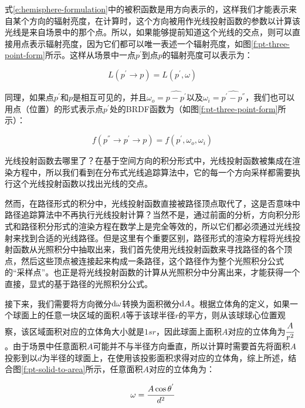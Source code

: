 式\ref{e:hemisphere-formulation}中的被积函数是用方向表示的，这样我们才能表示来自某个方向的辐射亮度，在计算时，这个方向被用作光线投射函数的参数以计算该光线是来自场景中的那个点。所以，如果能够提前知道这个光线的交点，则可以直接用点表示辐射亮度，因为它们都可以唯一表述一个辐射亮度，如图\ref{f:pt-three-point-form}所示。这样从场景中一点$p^{'}$到点$p$的辐射亮度可以表示为：

\begin{equation*}
	L(p^{'}\to p)=L(p^{'},\omega)
\end{equation*}

同理，如果点$p^{'}$和$p$是相互可见的，并且$\omega_o=\widehat{p-p^{'}}$以及$\omega_i=\widehat{p^{'}-p^{''}}$，我们也可以用点（位置）的形式表示点$p^{'}$处的BRDF函数为（如图\ref{f:pt-three-point-form}所示）：

\begin{equation*}
	f(p^{''}\to p^{'}\to p)=f(p^{'},\omega_o,\omega_i)
\end{equation*}

\begin{myshaded}
	光线投射函数去哪里了？在基于空间方向的积分形式中，光线投射函数被集成在渲染方程中，所以我们看到在分布式光线追踪算法中，它的每一个方向采样都需要执行这个光线投射函数以找出光线的交点。
	
	\indent 然而，在路径形式的积分中，光线投射函数直接被路径顶点取代了，这是否意味中路径追踪算法中不再执行光线投射计算？当然不是，通过前面的分析，方向积分形式和路径积分形式的渲染方程在数学上是完全等效的，所以它们都必须通过光线投射来找到合适的光线路径。但是这里有个重要区别，路径形式的渲染方程将光线投射函数从光照积分中抽取出来，我们首先使用光线投射函数来寻找路径的各个顶点，然后这些顶点被连接起来构成一条路径，这个路径作为整个光照积分公式的“采样点”。也正是将光线投射函数的计算从光照积分中分离出来，才能获得一个直接，显式的基于路径的光照积分公式。
\end{myshaded}

接下来，我们需要将方向微分${\rm d}\omega$转换为面积微分${\rm d}A$。根据立体角的定义，如果一个球面上的任意一块区域的面积$A$等于该球半径$r$的平方，则从该球球心位置观察，该区域面积对应的立体角大小就是$1sr$，因此球面上面积$A$对应的立体角为$ \cfrac{A}{r^{2}}$。由于场景中任意面积$A$可能并不与半径方向垂直，所以计算时需要首先将面积$A$投影到以$d$为半径的球面上，在使用该投影面积求得对应的立体角，综上所述，结合图\ref{f:pt-solid-to-area}所示，任意面积$A$对应的立体角为：

\begin{equation}
	\omega= \cfrac{A\cos{\theta^{'}}}{d^2}
\end{equation}

